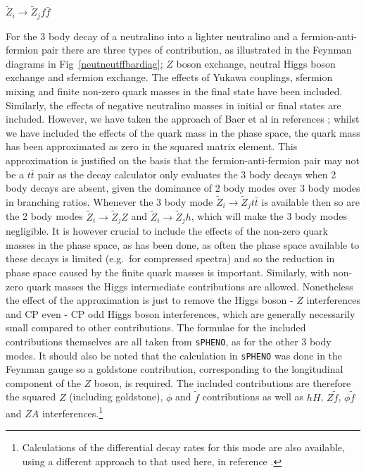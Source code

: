 \documentclass[final,3p,times,pdflatex]{elsarticle}
\begin{document}
\textbf{\underline{$\tilde{Z}_i \rightarrow \tilde{Z}_j f \bar{f}$}}

For the 3 body decay of a neutralino into a lighter neutralino and a fermion-anti-fermion pair there are three types of contribution, as illustrated in the Feynman diagrams in Fig~\ref{neutneutffbardiag}; $Z$ boson exchange, neutral Higgs boson exchange and sfermion exchange. The effects of Yukawa couplings, sfermion mixing and finite non-zero quark masses in the final state have been included. Similarly, the effects of negative neutralino masses in initial or final states are included. However, we have taken the approach of Baer et al in references \cite{Baer:1998,TataBaer}; whilst we have included the effects of the quark mass in the phase space, the quark mass has been approximated as zero in the squared matrix element. This approximation is justified on the basis that the fermion-anti-fermion pair may not be a $t\bar{t}$ pair as the decay calculator only evaluates the 3 body decays when 2 body decays are absent, given the dominance of 2 body modes over 3 body modes in branching ratios. Whenever the 3 body mode $\tilde{Z}_i \rightarrow \tilde{Z}_j t \bar{t}$ is available then so are the 2 body modes $\tilde{Z}_i \rightarrow \tilde{Z}_j Z$ and $\tilde{Z}_i \rightarrow \tilde{Z}_j h$, which will make the 3 body modes negligible. It is however crucial to include the effects of the non-zero quark masses in the phase space, as has been done, as often the phase space available to these decays is limited (e.g.\ for compressed spectra) and so the reduction in phase space caused by the finite quark masses is important. Similarly, with non-zero quark masses the Higgs intermediate contributions are allowed. Nonetheless the effect of the approximation is just to remove the Higgs boson - $Z$ interferences and CP even - CP odd Higgs boson interferences, which are generally necessarily small compared to other contributions. The formulae for the included contributions themselves are all taken from {\tt sPHENO}, as for the other 3 body modes. It should also be noted that the calculation in {\tt sPHENO} was done in the Feynman gauge so a goldstone contribution, corresponding to the longitudinal component of the $Z$ boson, is required. The included contributions are therefore the squared $Z$ (including goldstone), $\phi$ and $\tilde{f}$ contributions as well as $hH$, $Z\tilde{f}$, $\phi\tilde{f}$ and $ZA$ interferences.\footnote{Calculations of the differential decay rates for this mode are also available, using a different approach to that used here, in reference \cite{Mambrini:2001}.}
\end{document}
